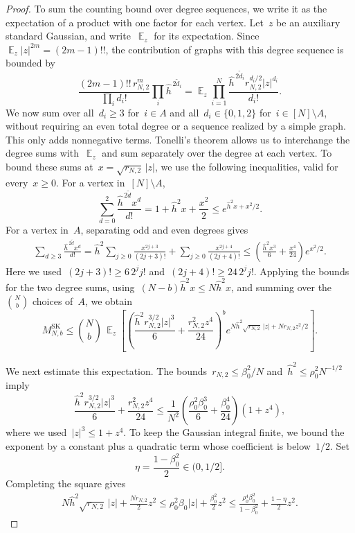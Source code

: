 \documentclass[letterpaper,11pt,reqno]{amsart}
\renewcommand{\leq}{\leqslant}
\renewcommand{\geq}{\geqslant}
\DeclareMathOperator{\E}{\mathds{E}}
\newcommand{\hh}{\hat{h}}
\begin{document}
\begin{proof}
To sum the counting bound over degree sequences, we write it as the expectation of a product with one factor for each vertex. Let~$z$ be an auxiliary standard Gaussian, and write~$\E_z$ for its expectation. Since~$\E_z|z|^{2m}=(2m-1)!!$, the contribution of graphs with this degree sequence is bounded by
\begin{equation*}
\frac{(2m-1)!!\,r_{N,2}^{m}}{\prod_i d_i!}
\prod_i\hh^{\,2\widetilde d_i}
=\E_z\prod_{i=1}^N
\frac{\hh^{\,2\widetilde d_i}r_{N,2}^{d_i/2}|z|^{d_i}}{d_i!}.
\end{equation*}
We now sum over all~$d_i\geq3$ for~$i\in A$ and all~$d_i\in\{0,1,2\}$ for~$i\in[N]\setminus A$, without requiring an even total degree or a sequence realized by a simple graph. This only adds nonnegative terms. Tonelli's theorem allows us to interchange the degree sums with~$\E_z$ and sum separately over the degree at each vertex. To bound these sums at~$x=\sqrt{r_{N,2}}\,|z|$, we use the following inequalities, valid for every~$x\geq0$. For a vertex in~$[N]\setminus A$,
\begin{equation*}
\sum_{d=0}^{2}\frac{\hh^{\,2\widetilde d}x^d}{d!}
=1+\hh^2x+\frac{x^2}{2}
\leq e^{\hh^2x+x^2/2}.
\end{equation*}
For a vertex in~$A$, separating odd and even degrees gives
\begin{align*}
\sum_{d\geq3}\frac{\hh^{\,2\widetilde d}x^d}{d!}
=\hh^2\sum_{j\geq0}\frac{x^{2j+3}}{(2j+3)!}
+\sum_{j\geq0}\frac{x^{2j+4}}{(2j+4)!}
\leq\left(\frac{\hh^2x^3}{6}+\frac{x^4}{24}\right)e^{x^2/2}.
\end{align*}
Here we used~$(2j+3)!\geq6\,2^jj!$ and~$(2j+4)!\geq24\,2^jj!$. Applying the bounds for the two degree sums, using~$(N-b)\hh^2x\leq N\hh^2x$, and summing over the~$\binom Nb$ choices of~$A$, we obtain
\begin{equation*}
M^{\mathrm{SK}}_{N,b}\leq\binom Nb\,\E_z\!\left[
\left(\frac{\hh^2r_{N,2}^{3/2}|z|^3}{6}+\frac{r_{N,2}^{2}z^4}{24}\right)^b
 e^{N\hh^2\sqrt{r_{N,2}}\,|z|+Nr_{N,2}z^2/2}\right].
\end{equation*}

We next estimate this expectation. The bounds~$r_{N,2}\leq\beta_0^2/N$ and~$\hh^2\leq\rho_0^2N^{-1/2}$ imply
\begin{equation*}
\frac{\hh^2r_{N,2}^{3/2}|z|^3}{6}+\frac{r_{N,2}^{2}z^4}{24}
\leq\frac{1}{N^2}
\left(\frac{\rho_0^2\beta_0^3}{6}+\frac{\beta_0^4}{24}\right)(1+z^4),
\end{equation*}
where we used~$|z|^3\leq1+z^4$. To keep the Gaussian integral finite, we bound the exponent by a constant plus a quadratic term whose coefficient is below~$1/2$. Set
\begin{equation*}
\eta=\frac{1-\beta_0^2}{2}\in(0,1/2].
\end{equation*}
Completing the square gives
\begin{align*}
N\hh^2\sqrt{r_{N,2}}\,|z|+\frac{Nr_{N,2}}2z^2
\leq\rho_0^2\beta_0|z|+\frac{\beta_0^2}{2}z^2
\leq\frac{\rho_0^4\beta_0^2}{1-\beta_0^2}+\frac{1-\eta}{2}z^2.
\end{align*}


\end{proof}
\end{document}
